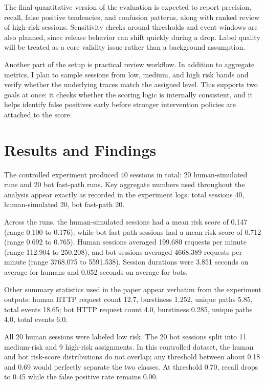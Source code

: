 \documentclass[12pt]{article}
\begin{document}
The final quantitative version of the evaluation is expected to report precision, recall, false positive tendencies, and confusion patterns, along with ranked review of high-risk sessions. Sensitivity checks around thresholds and event windows are also planned, since release behavior can shift quickly during a drop. Label quality will be treated as a core validity issue rather than a background assumption.

Another part of the setup is practical review workflow. In addition to aggregate metrics, I plan to sample sessions from low, medium, and high risk bands and verify whether the underlying traces match the assigned level. This supports two goals at once: it checks whether the scoring logic is internally consistent, and it helps identify false positives early before stronger intervention policies are attached to the score.

\section{Results and Findings}
The controlled experiment produced 40 sessions in total: 20 human-simulated runs and 20 bot fast-path runs. Key aggregate numbers used throughout the analysis appear exactly as recorded in the experiment logs: total sessions 40, human-simulated 20, bot fast-path 20.

Across the runs, the human-simulated sessions had a mean risk score of 0.147 (range 0.100 to 0.176), while bot fast-path sessions had a mean risk score of 0.712 (range 0.692 to 0.765). Human sessions averaged 199.680 requests per minute (range 112.904 to 250.208), and bot sessions averaged 4668.389 requests per minute (range 3768.075 to 5591.538). Session durations were 3.851 seconds on average for humans and 0.052 seconds on average for bots.

Other summary statistics used in the paper appear verbatim from the experiment outputs: human HTTP request count 12.7, burstiness 1.252, unique paths 5.85, total events 18.65; bot HTTP request count 4.0, burstiness 0.285, unique paths 4.0, total events 6.0.

All 20 human sessions were labeled low risk. The 20 bot sessions split into 11 medium-risk and 9 high-risk assignments. In this controlled dataset, the human and bot risk-score distributions do not overlap; any threshold between about 0.18 and 0.69 would perfectly separate the two classes. At threshold 0.70, recall drops to 0.45 while the false positive rate remains 0.00.
\end{document}
